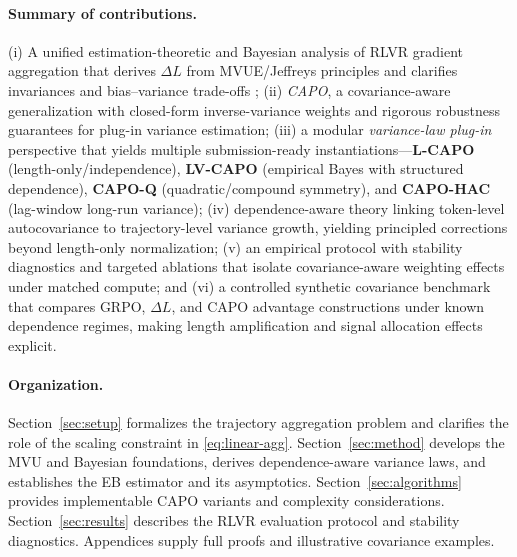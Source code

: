 \paragraph{Summary of contributions.}
(i) A unified estimation-theoretic and Bayesian analysis of RLVR gradient aggregation that derives $\Delta L$ from MVUE/Jeffreys principles and clarifies invariances and bias--variance trade-offs \citep{jeffreys1946invariant,he2025deltal}; (ii) \emph{CAPO}, a covariance-aware generalization with closed-form inverse-variance weights and rigorous robustness guarantees for plug-in variance estimation; (iii) a modular \emph{variance-law plug-in} perspective that yields multiple submission-ready instantiations---\textbf{L-CAPO} (length-only/independence), \textbf{LV-CAPO} (empirical Bayes with structured dependence), \textbf{CAPO-Q} (quadratic/compound symmetry), and \textbf{CAPO-HAC} (lag-window long-run variance); (iv) dependence-aware theory linking token-level autocovariance to trajectory-level variance growth, yielding principled corrections beyond length-only normalization; (v) an empirical protocol with stability diagnostics and targeted ablations that isolate covariance-aware weighting effects under matched compute; and (vi) a controlled synthetic covariance benchmark that compares GRPO, $\Delta L$, and CAPO advantage constructions under known dependence regimes, making length amplification and signal allocation effects explicit.

\paragraph{Organization.}
Section~\ref{sec:setup} formalizes the trajectory aggregation problem and clarifies the role of the scaling constraint in \eqref{eq:linear-agg}.
Section~\ref{sec:method} develops the MVU and Bayesian foundations, derives dependence-aware variance laws, and establishes the EB estimator and its asymptotics.
Section~\ref{sec:algorithms} provides implementable CAPO variants and complexity considerations.
Section~\ref{sec:results} describes the RLVR evaluation protocol and stability diagnostics.
Appendices supply full proofs and illustrative covariance examples.